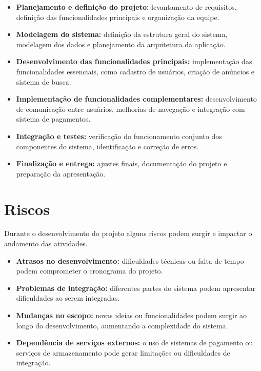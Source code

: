 \documentclass[a4paper,12pt]{article}
\begin{document}
\begin{itemize}
    \item \textbf{Planejamento e definição do projeto:} levantamento de requisitos, definição das funcionalidades principais e organização da equipe.

    \item \textbf{Modelagem do sistema:} definição da estrutura geral do sistema, modelagem dos dados e planejamento da arquitetura da aplicação.

    \item \textbf{Desenvolvimento das funcionalidades principais:} implementação das funcionalidades essenciais, como cadastro de usuários, criação de anúncios e sistema de busca.

    \item \textbf{Implementação de funcionalidades complementares:} desenvolvimento de comunicação entre usuários, melhorias de navegação e integração com sistema de pagamentos.

    \item \textbf{Integração e testes:} verificação do funcionamento conjunto dos componentes do sistema, identificação e correção de erros.

    \item \textbf{Finalização e entrega:} ajustes finais, documentação do projeto e preparação da apresentação.
\end{itemize}

\section{Riscos}

Durante o desenvolvimento do projeto alguns riscos podem surgir e impactar o andamento das atividades.

\begin{itemize}
    \item \textbf{Atrasos no desenvolvimento:} dificuldades técnicas ou falta de tempo podem comprometer o cronograma do projeto.

    \item \textbf{Problemas de integração:} diferentes partes do sistema podem apresentar dificuldades ao serem integradas.

    \item \textbf{Mudanças no escopo:} novas ideias ou funcionalidades podem surgir ao longo do desenvolvimento, aumentando a complexidade do sistema.

    \item \textbf{Dependência de serviços externos:} o uso de sistemas de pagamento ou serviços de armazenamento pode gerar limitações ou dificuldades de integração.
\end{itemize}
\end{document}
